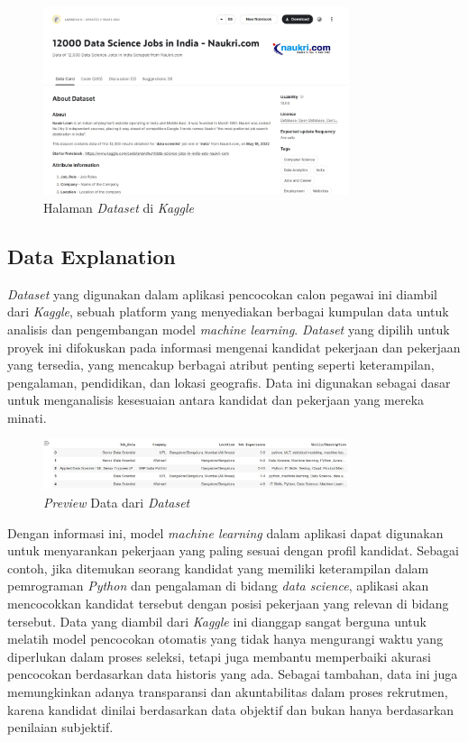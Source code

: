 \documentclass[journal,article,submit,pdftex,moreauthors]{Definitions/mdpi}
\begin{document}
\begin{figure}[H]
    \centering
    \includegraphics[width=0.8\textwidth]{image/datasetkaggle.jpeg} %
    \captionsetup{justification=centering}
    \caption{Halaman \textit{Dataset} di \textit{Kaggle}}
    \label{fig:kaggle}
\end{figure}

\subsection{Data Explanation}
\textit{Dataset} yang digunakan dalam aplikasi pencocokan calon pegawai ini diambil dari \textit{Kaggle}, sebuah platform yang menyediakan berbagai kumpulan data untuk analisis dan pengembangan model \textit{machine learning}. \textit{Dataset} yang dipilih untuk proyek ini difokuskan pada informasi mengenai kandidat pekerjaan dan pekerjaan yang tersedia, yang mencakup berbagai atribut penting seperti keterampilan, pengalaman, pendidikan, dan lokasi geografis. Data ini digunakan sebagai dasar untuk menganalisis kesesuaian antara kandidat dan pekerjaan yang mereka minati.

\begin{figure}[H]
    \centering
    \includegraphics[width=0.8\textwidth]{image/datatabeldatasets.jpeg} %
    \captionsetup{justification=centering}
    \caption{\textit{Preview} Data dari \textit{Dataset}}
    \label{fig:datatabeldatasets}
\end{figure}

Dengan informasi ini, model \textit{machine learning} dalam aplikasi dapat digunakan untuk menyarankan pekerjaan yang paling sesuai dengan profil kandidat. Sebagai contoh, jika ditemukan seorang kandidat yang memiliki keterampilan dalam pemrograman \textit{Python} dan pengalaman di bidang \textit{data science}, aplikasi akan mencocokkan kandidat tersebut dengan posisi pekerjaan yang relevan di bidang tersebut. Data yang diambil dari \textit{Kaggle} ini dianggap sangat berguna untuk melatih model pencocokan otomatis yang tidak hanya mengurangi waktu yang diperlukan dalam proses seleksi, tetapi juga membantu memperbaiki akurasi pencocokan berdasarkan data historis yang ada. Sebagai tambahan, data ini juga memungkinkan adanya transparansi dan akuntabilitas dalam proses rekrutmen, karena kandidat dinilai berdasarkan data objektif dan bukan hanya berdasarkan penilaian subjektif.
\end{document}
